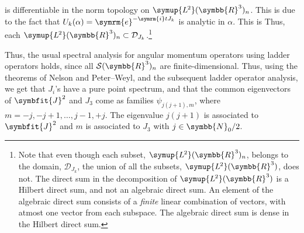 \documentclass[12pt, a4 paper]{article}
\let\symcal\mathcal
\theoremstyle{definition}
\newcommand{\ltwo}{\symup{L\kern-0.5pt^2}}
\newcommand{\ltworthree}{\ltwo(\rr^3)}
\newcommand{\rr}{\symbb{R}}
\newcommand{\schwartz}{\symcal{S}}
\newcommand{\schwartzrthree}{\schwartz(\rr^3)}
\renewcommand{\i}{\symrm{i}}
\newcommand{\e}{\symrm{e}}
\newcommand{\domain}{\symcal{D}}
\begin{document}
    is differentiable in the norm topology on \(\ltworthree_n\). This is due to the fact that \(U_k(\alpha) = \e^{-\i t J_k}\) is analytic in \(\alpha\). This is  Thus, each \(\ltworthree_n \subset \domain_{J_k}\).\footnote{Note that even though each subset, \(\ltworthree_n\), belongs to the domain, \(\domain_{J_k}\), the union of all the subsets, \(\ltworthree\), does not. The direct sum in the decomposition of \(\ltworthree\) is a Hilbert direct sum, and not an algebraic direct sum. An element of the algebraic direct sum consists of a \textit{finite} linear combination of vectors, with atmost one vector from each subspace. The algebraic direct sum is dense in the Hilbert direct sum.}

    Thus, the usual spectral analysis for angular momentum operators using ladder operators holds, since all \(\schwartzrthree_n\) are finite-dimensional. Thus, using the theorems of Nelson and Peter--Weyl, and the subsequent ladder operator analysis, we get that $J_i$'s have a pure point spectrum, and that the common eigenvectors of $\symbfit{J}^2$ and $J_3$ come as families $\psi_{j(j+1), m}$, where $m = -j, -j+1, \ldots, j-1, +j$. The eigenvalue $j(j+1)$ is associated to $\symbfit{J}^2$ and $m$ is associated to $J_3$ with $j \in \symbb{N}_0/2$.
\end{document}
